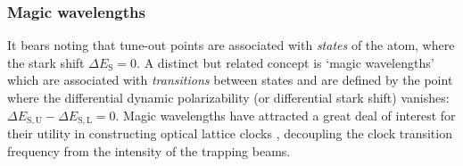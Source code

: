 \subsubsection{Magic wavelengths}
	It bears noting that tune-out points are associated with \emph{states} of the atom, where the stark shift $\Delta E_\mathrm{S} =0$.
	A distinct but related concept is `magic wavelengths' which are associated with \emph{transitions} between states and are defined by the point where the differential dynamic polarizability (or differential stark shift) vanishes: $\Delta E_\mathrm{S,U}-\Delta E_\mathrm{S,L} = 0$. 
	Magic wavelengths have attracted a great deal of interest for their utility in constructing optical lattice clocks \cite{Takamoto05,Derevianko11}, decoupling the clock transition frequency from the intensity of the trapping beams.


